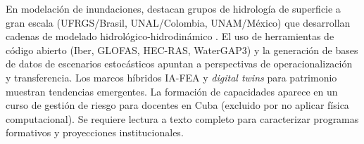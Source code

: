 \documentclass[12pt,a4paper]{article}
\begin{document}
En modelación de inundaciones, destacan grupos de hidrología de superficie a gran escala (UFRGS/Brasil, UNAL/Colombia, UNAM/México) que desarrollan cadenas de modelado hidrológico-hidrodinámico \parencite{fagundes2021sediment, fleischmann2021regional, escobarsilva2023assessing}. El uso de herramientas de código abierto (Iber, GLOFAS, HEC-RAS, WaterGAP3) y la generación de bases de datos de escenarios estocásticos \parencite{aranguiz2024new} apuntan a perspectivas de operacionalización y transferencia. Los marcos híbridos IA-FEA \parencite{yupanqui2025hybrid} y \textit{digital twins} para patrimonio \parencite{aroquipa2025methodological} muestran tendencias emergentes. La formación de capacidades aparece en un curso de gestión de riesgo para docentes en Cuba \parencite{varelaledesma2021tecnolog} (excluido por no aplicar física computacional). Se requiere lectura a texto completo para caracterizar programas formativos y proyecciones institucionales.

\end{document}

